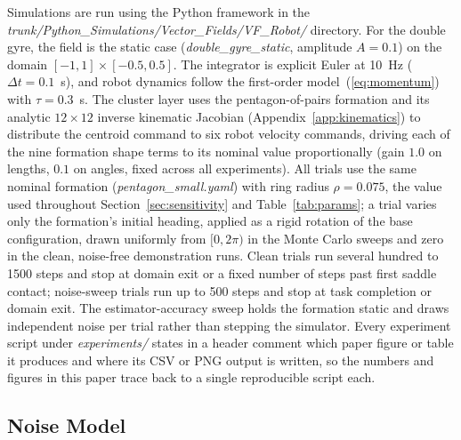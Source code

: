 \documentclass[lettersize,journal]{IEEEtran}
\begin{document}
Simulations are run using the Python framework in the
\textit{trunk/Python\_Simulations/Vector\_Fields/VF\_Robot/} directory.
For the double gyre, the field is the static case
(\textit{double\_gyre\_static}, amplitude $A = 0.1$) on the domain
$[-1, 1] \times [-0.5, 0.5]$. The integrator is explicit Euler at
10~Hz ($\Delta t = 0.1$~s), and robot dynamics follow the first-order
model~(\ref{eq:momentum}) with $\tau = 0.3$~s. The cluster layer uses
the pentagon-of-pairs formation and its analytic $12 \times 12$ inverse
kinematic Jacobian (Appendix~\ref{app:kinematics}) to distribute the
centroid command to six robot velocity commands, driving each of the
nine formation shape terms to its nominal value proportionally (gain
$1.0$ on lengths, $0.1$ on angles, fixed across all experiments). All
trials use the same nominal formation (\textit{pentagon\_small.yaml})
with ring radius $\rho = 0.075$, the value used throughout
Section~\ref{sec:sensitivity} and Table~\ref{tab:params}; a trial
varies only the formation's initial heading, applied as a rigid
rotation of the base configuration, drawn uniformly from $[0, 2\pi)$ in
the Monte Carlo sweeps and zero in the clean, noise-free demonstration
runs. Clean trials run several hundred to 1500 steps and stop at domain
exit or a fixed number of steps past first saddle contact; noise-sweep
trials run up to 500 steps and stop at task completion or domain exit.
The estimator-accuracy sweep holds the formation static and draws
independent noise per trial rather than stepping the simulator. Every
experiment script under \textit{experiments/} states in a header
comment which paper figure or table it produces and where its CSV or
PNG output is written, so the numbers and figures in this paper trace
back to a single reproducible script each.


\subsection{Noise Model}
\label{sec:noise_model}
\end{document}
